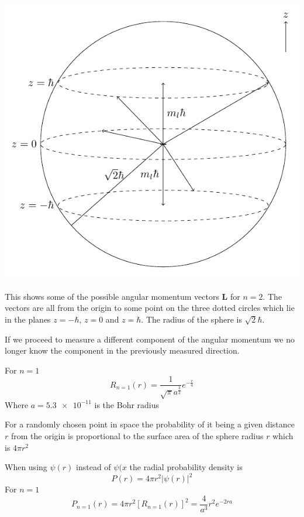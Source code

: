 \documentclass{article}
\renewcommand{\vec}[1]{\underline{#1}}
\renewcommand{\vec}[1]{\bm{#1}}
\newcommand{\vv}[1]{\vec{#1}}
\newcommand{\hb}{\hbar}
\begin{document}
\begin{center}
\includegraphics[scale=0.4]{ElectronAngularMomentum}
\end{center}
This shows some of the possible angular momentum vectors \(\vv L\) for \(n=2\). The vectors are all from the origin to some point on the three dotted circles which lie in the planes \(z=-\hb,\,z=0\) and \(z=\hb\). The radius of the sphere is \(\sqrt 2\hb\).

If we proceed to measure a different component of the angular momentum we no longer know the component in the previously measured direction.

For \(n=1\)
\[R_{n=1}(r)=\frac{1}{\sqrt\pi a^{\frac32}}e^{-\frac ra}\]
Where \(a=\num{5.3e-11}\) is the Bohr radius

For a randomly chosen point in space the probability of it being a given distance \(r\) from the origin is proportional to the surface area of the sphere radius \(r\) which is \(4\pi r^2\)

When using \(\psi(r)\) instead of \(\psi(x\) the radial probability density is
\[P(r)=4\pi r^2|\psi(r)|^2\]
For \(n=1\)
\[P_{n=1}(r)=4\pi r^2[R_{n=1}(r)]^2=\frac{4}{a^3}r^2e^{-2ra}\]
\end{document}
